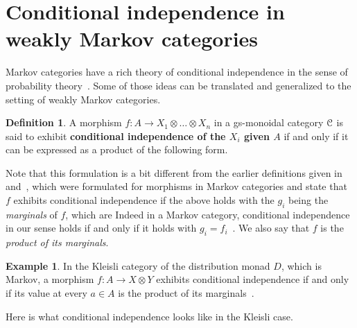 \documentclass[a4paper,UKenglish,numberwithinsect,cleveref, autoref, thm-restate]{lipics-v2021}
\theoremstyle{plain} %
\theoremstyle{definition} %
\newtheorem{mydefinition}[mytheorem]{Definition}
\newtheorem{myexample}[mytheorem]{Example}
\begin{document}
\section{Conditional independence in weakly Markov categories}

Markov categories have a rich theory of conditional independence in the sense of probability theory~\cite{fritz2022dseparation}. 
Some of those ideas can be translated and generalized to the setting of weakly Markov categories. 

\begin{mydefinition}\label{defcondind}
 A morphism $f:A\to X_1\otimes\dots\otimes X_n$ in a gs-monoidal category $\mathcal{C}$ is said to exhibit \textbf{conditional independence of the $X_i$ given $A$} if and only if it can be expressed as a product of the following form.
\end{mydefinition}

Note that this formulation is a bit different from the earlier definitions given in \cite[Definition~6.6]{cho_jacobs_2019} and~\cite[Definition~12.12]{Fritz_2020}, which were formulated for morphisms in Markov categories and state that $f$ exhibits conditional independence if the above holds with the $g_i$ being the \emph{marginals} of $f$, which are
Indeed in a Markov category, conditional independence in our sense holds if and only if it holds with $g_i = f_i$~\cite[Lemma~12.11]{Fritz_2020}.
We also say that $f$ is the \emph{product of its marginals}.

\begin{myexample}
 In the Kleisli category of the distribution monad $D$, which is Markov, a morphism $f:A\to X\otimes Y$ exhibits conditional independence if and only if its value at every $a \in A$ is the product of its marginals~\cite[Section~12]{Fritz_2020}.
\end{myexample}

Here is what conditional independence looks like in the Kleisli case.
\end{document}
